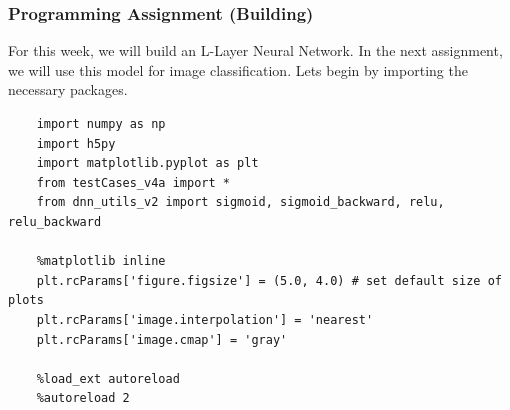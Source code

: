 \documentclass[11pt, a4paper]{article}
\begin{document}
\begin{spacing}{1.1}
	\subsubsection{Programming Assignment (Building)}
	For this week, we will build an L-Layer Neural Network. In the next assignment, we will use this model for image classification. Lets begin by importing the necessary packages. 
	\begin{lstlisting}
	import numpy as np
	import h5py
	import matplotlib.pyplot as plt
	from testCases_v4a import *
	from dnn_utils_v2 import sigmoid, sigmoid_backward, relu, relu_backward
	
	%matplotlib inline
	plt.rcParams['figure.figsize'] = (5.0, 4.0) # set default size of plots
	plt.rcParams['image.interpolation'] = 'nearest'
	plt.rcParams['image.cmap'] = 'gray'
	
	%load_ext autoreload
	%autoreload 2
	

\end{lstlisting}
\end{spacing}
\end{document}
